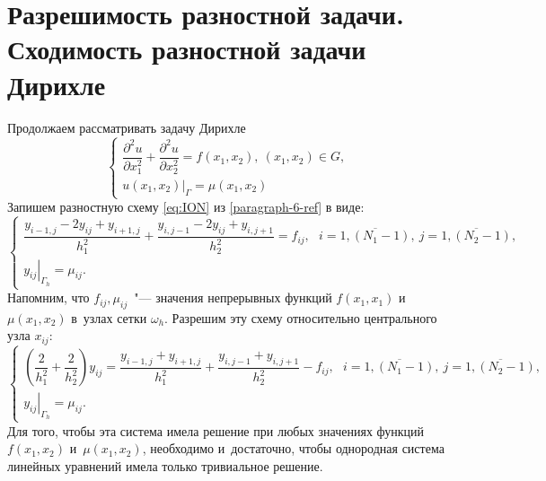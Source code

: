 \documentclass[11pt,a4paper,twoside]{report}
\numberwithin{equation}{section}
\theoremstyle{definition}
\theoremstyle{plain}
\begin{document}
\section{Разрешимость разностной задачи. Сходимость разностной задачи Дирихле}
%
Продолжаем рассматривать задачу Дирихле
%
\begin{equation}
    \label{dirihle_eq_7}
    \begin{cases}
        \dfrac{\partial^2u}{\partial x_1^2} + \dfrac{\partial^2u}{\partial x_2^2}
            = f(x_1, x_2),~(x_1, x_2) \in G,\\[.2em]
        \left.u(x_1, x_2)\right\vert_{\Gamma} = \mu(x_1, x_2) &
    \end{cases}
\end{equation}
%
Запишем разностную схему \eqref{eq:ION} из \ref{paragraph-6-ref} в виде:
%
$$
    \begin{cases}
        \dfrac{y_{i-1,j} - 2y_{ij} + y_{i+1,j}}{h_1^2} +
        \dfrac{y_{i,j-1} - 2y_{ij} + y_{i,j+1}}{h_2^2} = f_{ij},~~~
        i=\overline{1,(N_1-1)},~j=\overline{1,(N_2-1)},\\
        \left.y_{ij}\right\vert_{\Gamma_h}=\mu_{ij}.
    \end{cases}
$$
%
Напомним, что $f_{ij}, \mu_{ij}$~"--- значения непрерывных функций
$f(x_1, x_1)$ и $\mu(x_1,x_2)$ в~узлах сетки $\omega_h$.
Разрешим эту схему относительно центрального узла $x_{ij}$:
%
\begin{equation}
    \label{dirichet-first}
    \begin{cases}
        \left(\dfrac{2}{h_1^2} + \dfrac{2}{h_2^2}\right)y_{ij} =
            \dfrac{y_{i-1,j} + y_{i+1,j}}{h_1^2} +
            \dfrac{y_{i,j-1} + y_{i,j+1}}{h_2^2}-f_{ij},~~~
            i=\overline{1,(N_1-1)},~j=\overline{1,(N_2-1)},\\
        \left.y_{ij}\right\vert_{\Gamma_h}=\mu_{ij}.
    \end{cases}
\end{equation}
%
Для того, чтобы эта система имела решение при любых значениях функций
$f(x_1,x_2)$ и~$\mu(x_1,x_2)$, необходимо и~достаточно,
чтобы однородная система линейных уравнений имела только тривиальное решение.
\end{document}
